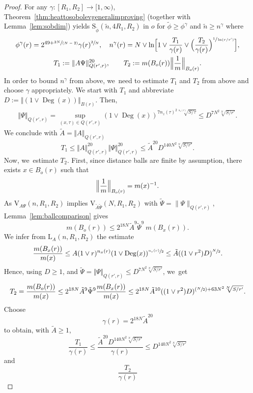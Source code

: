 \documentclass[10pt]{amsart}
\newcommand{\Psfrac}[2]{(\sfrac{#1}{#2})}
\newcommand{\spfrac}[2]{\sfrac{#1}{(#2)}}
\newcommand{\rS}{\mathrm{S}}
\newcommand{\rV}{\mathrm{V}}
\newcommand{\rL}{\mathrm{L}}
\theoremstyle{plain}
\theoremstyle{definition}
\DeclareMathOperator{\Deg}{Deg}
\begin{document}
\begin{proof}
For any $\gamma\colon[R_1,R_2]\to[1,\infty)$, Theorem~\ref{thm:heattosobolevgeneralimproving} (together with Lemma~\ref{lem:sobdim}) yields $\rS_{\tilde \phi}(\tilde n, 4R_1,R_2)$ in $o$ for $ \tilde \phi\ge \phi^{\gamma} $ and $ \tilde n\ge n^{\gamma} $ where
\begin{gather*}
\phi^{\gamma}(r)=2^{49+\spfrac{2 N}{N-2}}\gamma(r)^{\sfrac{2}{N}},
\quad
n^{\gamma}(r)= N\vee \ln\Bigl[1\vee
\frac{T_1}{\gamma(r)}\vee \Bigl(\frac{T_2}{\gamma(r)}\Bigr)^{\sfrac{1}{\ln(r/r')}}
\Bigr],
\\
T_1:={\Vert A\Psi\Vert_{Q(r',r)}^{20}},\qquad T_2:=m(B_o(r))\Bigl\|\frac1m\Bigr\|_{B_o(r)}.
\end{gather*}
In order to bound $n^{\gamma}$ from above, we~need to estimate $T_1$ and $T_2$ from above and choose $\gamma$ appropriately. We start with $T_1$ and abbreviate $
D :=\Vert (1\vee\Deg(x))\Vert_{B(r)}$. Then,
\begin{align*}
\Vert \Psi\Vert_{Q(r',r)}
=\sup_{(x,\tau)\in Q(r',r)} (1\vee\Deg(x))^{7n_z(\tau)^2\sqrt[n_z(\tau)]{S/\tau}}
\leq
D^{7 N^2\sqrt[ N]{S/r'}}.
\end{align*}
We conclude with $ \tilde A= \Vert A\Vert_{Q(r',r)}$
\[
T_1
\leq
\Vert A\Vert_{Q( r',r)}^{20}\Vert \Psi\Vert_{Q(r',r)}^{20}
\leq\tilde A^{20} D^{140 N^2\sqrt[ N]{S/r'}}.
\]
Now, we~estimate $T_2$. First, since distance balls are finite by assumption, there exists $x\in B_o(r)$ such that
\[
\Bigl\Vert \frac1m\Bigr\Vert_{B_o(r)}=m(x)^{-1}.
\]
{As $\rV_{\!A{\Psi}}(n,R_1,R_2)$ implies $\rV_{\!\tilde A{\tilde\Psi}}( N,R_1,R_2)$} with {$ \tilde \Psi=\|\Psi\|_{Q(r',r)} $}, Lemma~\ref{lem:ballcomparison} gives
\[
m(B_o(r))
\leq
2^{18 N}
\tilde A^9{\tilde\Psi^{9}}
\ m(B_{x}(r)).
\]
We infer from $\rL_{{A}}(n,R_1,R_2)$ the estimate
\[
\frac{m(B_{x}(r))}{m(x)}
\leq {A(1\vee r)^{n_x(r)}(1\vee\Deg(x))^{\sfrac{n_x(r)}{2}}}
\leq {\tilde A}{((1\vee r^2)
D)^{\sfrac{N}{2}}}.
\]
Hence, using $ D \geq 1$, and
{$\tilde \Psi=\Vert \Psi\Vert_{Q(r',r)}
\leq
D^{7 N^2\sqrt[ N]{S/r'}}$}, we~get
\begin{align*}
T_2
=\frac{m(B_{o}(r))}{m(x)}
\leq 2^{18 N}
\tilde A^9\tilde\Psi^9
\frac{m(B_{x}(r))}{m(x)}
\leq 2^{18 N}\tilde A^{10}
((1\vee r^2) D)^{\Psfrac{N}{2}+63 N^2\sqrt[ N]{S/r'}}.
\end{align*}
Choose
\[
\gamma(r)= {2^{18 N}\tilde A^{{20}}}
\]
to obtain, with $ \tilde A\ge 1 $,
\[
\frac{T_1}{\gamma(r)}
\leq
\frac{\tilde A^{20} D^{140 N^2\sqrt[ N]{S/r'}}}{\gamma(r)}
\leq D^{140 N^2\sqrt[ N]{S/r'}}
\]
and
\[
\frac{T_2}{\gamma(r)}
\]
\end{proof}
\end{document}
